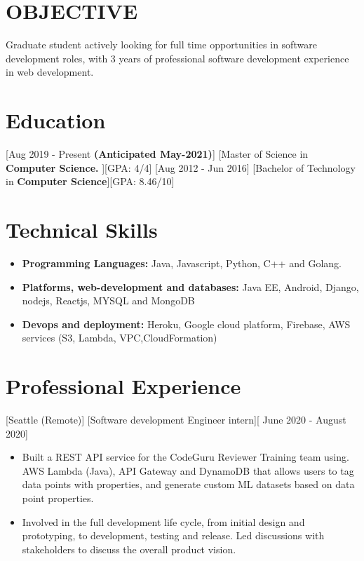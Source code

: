 \documentclass{article}
\begin{document}

\makecvtitle %
\section{OBJECTIVE}
Graduate student actively looking for full time opportunities in software development roles, with 3 years of professional software development experience in web development. 
\section{Education}
[\normalfont{}Aug 2019 - Present \textbf{(Anticipated May-2021)}]
[\normalfont{}Master of Science in \textbf{Computer Science. }][GPA: 4/4]
\vspace{0.1cm}
[\normalfont{}Aug 2012 - Jun 2016]
[\normalfont{}Bachelor of Technology in \textbf{Computer Science}][GPA: 8.46/10]
\vspace{0.25cm}
\section{Technical Skills}
\begin{itemize}
\item \textbf{Programming Languages:} Java, Javascript, Python, C++ and Golang.
\item \textbf{Platforms, web-development and databases:} Java EE, Android, Django, nodejs, Reactjs, MYSQL and MongoDB
\item \textbf{Devops and deployment:} Heroku, Google cloud platform, Firebase, AWS services (S3, Lambda, VPC,CloudFormation)
\end{itemize}
 
 
\section{Professional Experience}

[\normalfont{}Seattle (Remote)]
[Software development Engineer intern][\normalfont{} June 2020 - August 2020]
\vspace{0.25cm}
\begin{itemize}
\item Built a REST API service for the CodeGuru Reviewer Training team using. AWS Lambda (Java), API Gateway and DynamoDB that allows users to tag data points with properties, and generate custom ML datasets based on data point properties.
\item Involved in the full development life cycle, from initial design and prototyping, to development, testing and release. Led discussions with stakeholders to discuss the overall product vision.
\end{itemize}
\end{document}
